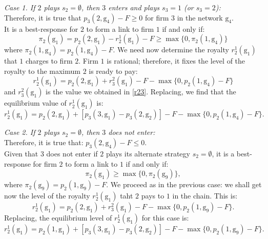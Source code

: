 \documentclass{article}
\begin{document}
\textit{Case 1. If $2$ plays $s_2=\emptyset$, then $3$ enters and plays $s_3=1$ (or $s_3=2$):}\\
Therefore, it is true that $p_3(2,\text{g}_4)-F\geq 0$ for firm $3$ in the network $\text{g}_4$.\\
It is a best-response for $2$ to form a link to firm $1$ if and only if: 
\begin{equation*}
    \pi_2(\text{g}_1)=p_2(2,\text{g}_1)-r^1_2(\text{g}_1)-F \geq \max\{0, \pi_2(1,\text{g}_4)\}
\end{equation*}
where $\pi_2(1,\text{g}_4)=p_2(1,\text{g}_4)-F$. We need now determine the royalty $r^1_2(\text{g}_1)$ that $1$ charges to firm $2$. Firm $1$ is rational; therefore, it fixes the level of the royalty to the maximum $2$ is ready to pay: 
\begin{equation*}
    r^1_2(\text{g}_1)= p_2(2,\text{g}_1)+r^2_3(\text{g}_1)-F - \max\{0, p_2(1,\text{g}_4)-F\}
\end{equation*}
and $r^2_3(\text{g}_1)$ is the value we obtained in \eqref{r23}. Replacing, we find that the equilibrium value of $r^1_2(\text{g}_1)$ is: 
\begin{equation}
    r^1_2(\text{g}_1)= p_2(2,\text{g}_1)+[ p_3(3,\text{g}_1)-p_3(2,\text{g}_2)]-F - \max\{0, p_2(1,\text{g}_4)-F\}. \label{r12}
\end{equation}

\textit{Case 2. If $2$ plays $s_2=\emptyset$, then $3$ does not enter:}\\
Therefore, it is true that: $p_3(2,\text{g}_4)-F\leq 0$. \\
Given that $3$ does not enter if $2$ plays its alternate strategy $s_2=\emptyset$, it is a best-response for firm $2$ to form a link to $1$ if and only if: 
\begin{equation*}
    \pi_2(\text{g}_1)\geq \max\{0, \pi_2(\text{g}_9)\},
\end{equation*}
where $\pi_2(\text{g}_9)=p_2(1,\text{g}_9)-F$. We proceed as in the previous case: we shall get now the level of the royalty $r^1_2(\text{g}_1)$ taht $2$ pays to $1$ in the chain. This is: 
\begin{equation*}
    r^1_2(\text{g}_1)=p_2(2,\text{g}_1) +r^2_3(\text{g}_1)-F- \max\{0, p_2(1,\text{g}_9)-F\}. 
\end{equation*}
Replacing, the equilibrium level of $r^1_2(\text{g}_1)$ for this case is: 
\begin{equation}
    r^1_2(\text{g}_1)=p_2(1,\text{g}_1)+[ p_3(3,\text{g}_1)-p_3(2,\text{g}_2)]-F - \max\{0, p_2(1,\text{g}_9)-F\}.\label{r12bis}
\end{equation}
\end{document}
